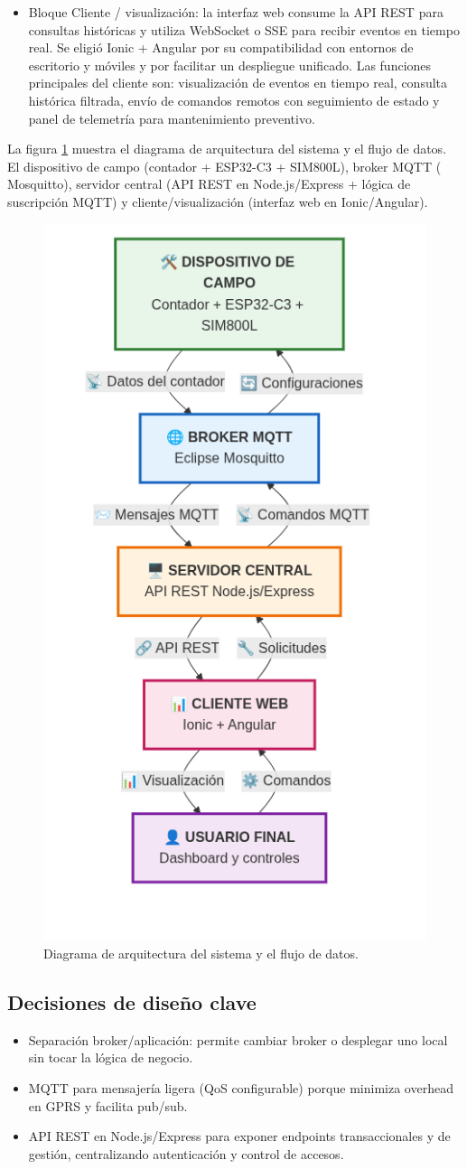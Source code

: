 \begin{itemize}
  \item {Bloque Cliente / visualización:} la interfaz web consume la API REST para consultas históricas y utiliza WebSocket o SSE para recibir eventos en tiempo real. Se eligió Ionic + Angular por su compatibilidad con entornos de escritorio y móviles y por facilitar un despliegue unificado. Las funciones principales del cliente son: visualización de eventos en tiempo real, consulta histórica filtrada, envío de comandos remotos con seguimiento de estado y panel de telemetría para mantenimiento preventivo.
\end{itemize}



La figura \ref{fig:diag_arquitectura} muestra el diagrama de arquitectura del sistema y el flujo de datos. 
El dispositivo de campo (contador + ESP32-C3 + SIM800L), broker MQTT ( Mosquitto),  servidor central (API REST en Node.js/Express + lógica de suscripción MQTT) y  cliente/visualización (interfaz web en Ionic/Angular).


\begin{figure}[htbp]
  \centering
  \includegraphics[width=0.4\linewidth]{./Figures/diagArq.png}
  \caption{Diagrama de arquitectura del sistema y el flujo de datos.}
  \label{fig:diag_arquitectura}
\end{figure}


\subsection{Decisiones de diseño clave}

\begin{itemize}

\item Separación broker/aplicación: permite cambiar broker o desplegar uno local sin tocar la lógica de negocio.

\item MQTT para mensajería ligera (QoS configurable) porque minimiza overhead en GPRS y facilita pub/sub.

\item API REST en Node.js/Express para exponer endpoints transaccionales y de gestión, centralizando autenticación y control de accesos.
\end{itemize}



